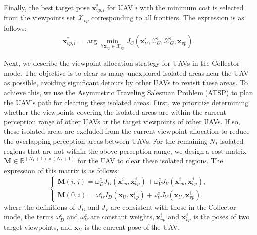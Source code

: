 \documentclass[letterpaper, 10pt, journal, twoside]{support/IEEEtran}
\begin{document}
Finally, the best target pose \(\mathbf{x}_{vp, i}^*\) for UAV $i$ with the minimum cost is selected from the viewpoints set $\mathcal{X}_{vp}$ corresponding to all frontiers. The expression is as follows:
\begin{equation}
  \label{eq_assign3}
  \begin{aligned}
    \mathbf{x}_{vp, i}^*= \arg\min_{\forall \mathbf{x}_{vp} \in \mathcal{X}_{vp}} J_C(\mathbf{x}_U^i, \mathcal{X}_U^i, \mathcal{X}_G^i, \mathbf{x}_{vp}).
  \end{aligned}
\end{equation}

Next, we describe the viewpoint allocation strategy for UAVs in the Collector mode. The objective is to clear as many unexplored isolated areas near the UAV as possible, avoiding significant detours by other UAVs to revisit these areas. To achieve this, we use the Asymmetric Traveling Salesman Problem (ATSP) \cite{zhou2023racer} to plan the UAV's path for clearing these isolated areas.
First, we prioritize determining whether the viewpoints covering the isolated areas are within the current perception range of other UAVs or the target viewpoints of other UAVs. If so, these isolated areas are excluded from the current viewpoint allocation to reduce the overlapping perception areas between UAVs. For the remaining \(N_I\) isolated regions that are not within the above perception range, we design a cost matrix \(\mathbf{M} \in \mathbb{R}^{(N_I+1)\times(N_I+1)}\) for the UAV to clear these isolated regions. The expression of this matrix is as follows: 
\begin{equation}
	\label{eq_assign4}
		\begin{cases} 
      \mathbf{M}(i, j) = \omega_D^c J_D(\mathbf{x}_{vp}^i, \mathbf{x}_{vp}^j) + \omega_V^c J_V(\mathbf{x}_{vp}^i, \mathbf{x}_{vp}^j), \\
      \mathbf{M}(0, i) = \omega_D^c J_D(\mathbf{x}_U, \mathbf{x}_{vp}^i) + \omega_V^c J_V(\mathbf{x}_U, \mathbf{x}_{vp}^i), 
	\end{cases}
\end{equation}
where the definitions of \( J_D \) and \( J_V \) are consistent with those in the Collector mode, the terms \( \omega_D^c \) and \( \omega_V^c \) are constant weights, \( \mathbf{x}_{vp}^i \) and \( \mathbf{x}_{vp}^j \) is the poses of two target viewpoints, and \( \mathbf{x}_U \) is the current pose of the UAV.
\end{document}
